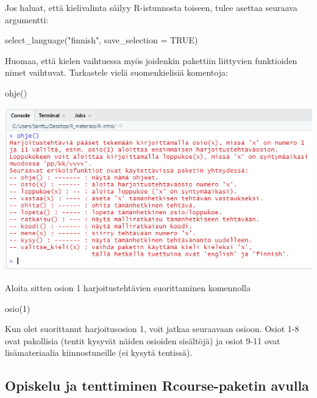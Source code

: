 \documentclass[
]{book}
\newenvironment{Shaded}{\begin{snugshade}}{\end{snugshade}}
\newcommand{\AttributeTok}[1]{\textcolor[rgb]{0.77,0.63,0.00}{#1}}
\newcommand{\ConstantTok}[1]{\textcolor[rgb]{0.00,0.00,0.00}{#1}}
\newcommand{\DecValTok}[1]{\textcolor[rgb]{0.00,0.00,0.81}{#1}}
\newcommand{\FunctionTok}[1]{\textcolor[rgb]{0.00,0.00,0.00}{#1}}
\newcommand{\NormalTok}[1]{#1}
\newcommand{\StringTok}[1]{\textcolor[rgb]{0.31,0.60,0.02}{#1}}
\begin{document}
Jos haluat, että kielivalinta säilyy R-istunnosta toiseen, tulee asettaa seuraava argumentti:

\begin{Shaded}
\begin{Highlighting}[]
\FunctionTok{select\_language}\NormalTok{(}\StringTok{"finnish"}\NormalTok{, }\AttributeTok{save\_selection =} \ConstantTok{TRUE}\NormalTok{)}
\end{Highlighting}
\end{Shaded}

Huomaa, että kielen vaihtuessa myös joidenkin pakettiin liittyvien funktioiden nimet vaihtuvat.
Tarkastele vielä suomenkielisiä komentoja:

\begin{Shaded}
\begin{Highlighting}[]
\FunctionTok{ohje}\NormalTok{()}
\end{Highlighting}
\end{Shaded}

\includegraphics{files/00-start/Rcourse_package_info.png}

Aloita sitten osion 1 harjoitustehtävien suorittaminen komennolla

\begin{Shaded}
\begin{Highlighting}[]
\FunctionTok{osio}\NormalTok{(}\DecValTok{1}\NormalTok{)}
\end{Highlighting}
\end{Shaded}

Kun olet suorittanut harjoitusosion 1, voit jatkaa seuraavaan osioon. Osiot 1-8 ovat pakollisia (tentit kysyvät näiden osioiden sisältöjä) ja osiot 9-11 ovat lisämateriaalia kiinnostuneille (ei kysytä tentissä).

\hypertarget{opiskelu-ja-tenttiminen-rcourse-paketin-avulla}{%
\subsection*{Opiskelu ja tenttiminen Rcourse-paketin avulla}\label{opiskelu-ja-tenttiminen-rcourse-paketin-avulla}}
\end{document}
